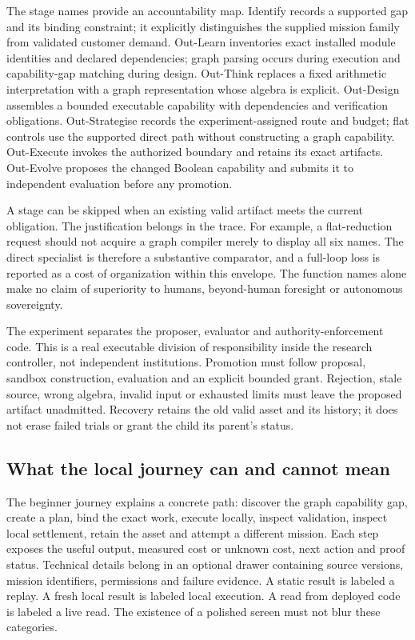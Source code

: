 \documentclass[11pt]{article}
\begin{document}
The stage names provide an accountability map. Identify records a supported gap and its binding constraint; it explicitly distinguishes the supplied mission family from validated customer demand. Out-Learn inventories exact installed module identities and declared dependencies; graph parsing occurs during execution and capability-gap matching during design. Out-Think replaces a fixed arithmetic interpretation with a graph representation whose algebra is explicit. Out-Design assembles a bounded executable capability with dependencies and verification obligations. Out-Strategise records the experiment-assigned route and budget; flat controls use the supported direct path without constructing a graph capability. Out-Execute invokes the authorized boundary and retains its exact artifacts. Out-Evolve proposes the changed Boolean capability and submits it to independent evaluation before any promotion.

A stage can be skipped when an existing valid artifact meets the current obligation. The justification belongs in the trace. For example, a flat-reduction request should not acquire a graph compiler merely to display all six names. The direct specialist is therefore a substantive comparator, and a full-loop loss is reported as a cost of organization within this envelope. The function names alone make no claim of superiority to humans, beyond-human foresight or autonomous sovereignty.

The experiment separates the proposer, evaluator and authority-enforcement code. This is a real executable division of responsibility inside the research controller, not independent institutions. Promotion must follow proposal, sandbox construction, evaluation and an explicit bounded grant. Rejection, stale source, wrong algebra, invalid input or exhausted limits must leave the proposed artifact unadmitted. Recovery retains the old valid asset and its history; it does not erase failed trials or grant the child its parent's status.

\subsection{What the local journey can and cannot mean}

The beginner journey explains a concrete path: discover the graph capability gap, create a plan, bind the exact work, execute locally, inspect validation, inspect local settlement, retain the asset and attempt a different mission. Each step exposes the useful output, measured cost or unknown cost, next action and proof status. Technical details belong in an optional drawer containing source versions, mission identifiers, permissions and failure evidence. A static result is labeled a replay. A fresh local result is labeled local execution. A read from deployed code is labeled a live read. The existence of a polished screen must not blur these categories.
\end{document}
